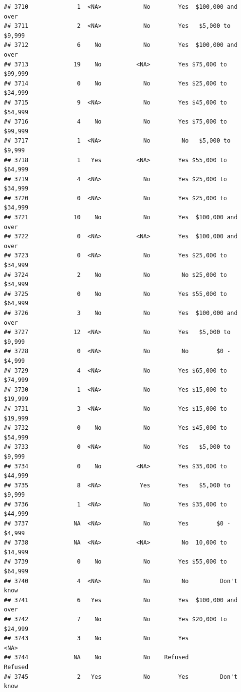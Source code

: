 \documentclass[man]{apa6}
\begin{document}
\begin{verbatim}
## 3710              1  <NA>            No        Yes  $100,000 and over
## 3711              2  <NA>            No        Yes   $5,000 to $9,999
## 3712              6    No            No        Yes  $100,000 and over
## 3713             19    No          <NA>        Yes $75,000 to $99,999
## 3714              0    No            No        Yes $25,000 to $34,999
## 3715              9  <NA>            No        Yes $45,000 to $54,999
## 3716              4    No            No        Yes $75,000 to $99,999
## 3717              1  <NA>            No         No   $5,000 to $9,999
## 3718              1   Yes          <NA>        Yes $55,000 to $64,999
## 3719              4  <NA>            No        Yes $25,000 to $34,999
## 3720              0  <NA>            No        Yes $25,000 to $34,999
## 3721             10    No            No        Yes  $100,000 and over
## 3722              0  <NA>          <NA>        Yes  $100,000 and over
## 3723              0  <NA>            No        Yes $25,000 to $34,999
## 3724              2    No            No         No $25,000 to $34,999
## 3725              0    No            No        Yes $55,000 to $64,999
## 3726              3    No            No        Yes  $100,000 and over
## 3727             12  <NA>            No        Yes   $5,000 to $9,999
## 3728              0  <NA>            No         No        $0 - $4,999
## 3729              4  <NA>            No        Yes $65,000 to $74,999
## 3730              1  <NA>            No        Yes $15,000 to $19,999
## 3731              3  <NA>            No        Yes $15,000 to $19,999
## 3732              0    No            No        Yes $45,000 to $54,999
## 3733              0  <NA>            No        Yes   $5,000 to $9,999
## 3734              0    No          <NA>        Yes $35,000 to $44,999
## 3735              8  <NA>           Yes        Yes   $5,000 to $9,999
## 3736              1  <NA>            No        Yes $35,000 to $44,999
## 3737             NA  <NA>            No        Yes        $0 - $4,999
## 3738             NA  <NA>          <NA>         No  10,000 to $14,999
## 3739              0    No            No        Yes $55,000 to $64,999
## 3740              4  <NA>            No         No         Don't know
## 3741              6   Yes            No        Yes  $100,000 and over
## 3742              7    No            No        Yes $20,000 to $24,999
## 3743              3    No            No        Yes               <NA>
## 3744             NA    No            No    Refused            Refused
## 3745              2   Yes            No        Yes         Don't know

\end{verbatim}
\end{document}
